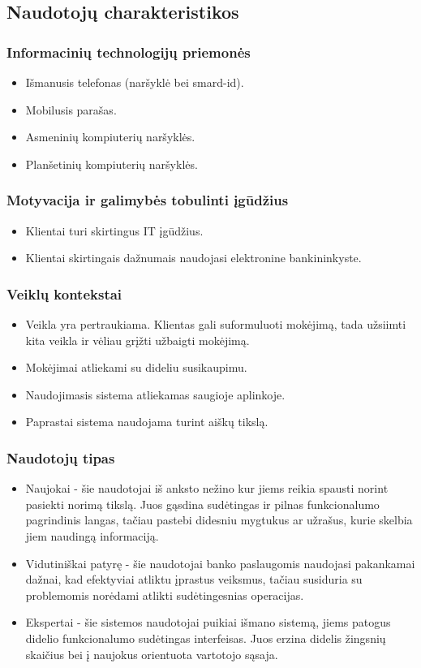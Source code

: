 \documentclass{VUMIFPSkursinis}
\begin{document}
\subsection{Naudotojų charakteristikos}
\subsubsection{Informacinių technologijų priemonės}
\begin{itemize}
	\item Išmanusis telefonas (naršyklė bei smard-id).
	\item Mobilusis parašas.
	\item Asmeninių kompiuterių naršyklės.
	\item Planšetinių kompiuterių naršyklės.
\end{itemize}
\subsubsection{Motyvacija ir galimybės tobulinti įgūdžius}
\begin{itemize}
	\item Klientai turi skirtingus IT įgūdžius.
	\item Klientai skirtingais dažnumais naudojasi elektronine bankininkyste.
\end{itemize}
\subsubsection{Veiklų kontekstai}
\begin{itemize}
	\item Veikla yra pertraukiama. Klientas gali suformuluoti mokėjimą, tada užsiimti kita veikla ir vėliau grįžti užbaigti mokėjimą.
	\item Mokėjimai atliekami su dideliu susikaupimu.
	\item Naudojimasis sistema atliekamas saugioje aplinkoje.
	\item Paprastai sistema naudojama turint aiškų tikslą.
\end{itemize}
\subsubsection{Naudotojų tipas}
\begin{itemize}
	\item Naujokai - šie naudotojai iš anksto nežino kur jiems reikia spausti norint pasiekti norimą tikslą. Juos gąsdina sudėtingas ir pilnas funkcionalumo pagrindinis langas, tačiau pastebi didesniu mygtukus ar užrašus, kurie skelbia jiem naudingą informaciją.
	\item Vidutiniškai patyrę - šie naudotojai banko paslaugomis naudojasi pakankamai dažnai, kad efektyviai atliktu įprastus veiksmus, tačiau susiduria su problemomis norėdami atlikti sudėtingesnias operacijas.
	\item Ekspertai - šie sistemos naudotojai puikiai išmano sistemą, jiems patogus didelio funkcionalumo sudėtingas interfeisas. Juos erzina didelis žingsnių skaičius bei į naujokus orientuota vartotojo sąsaja.
\end{itemize}
\end{document}
